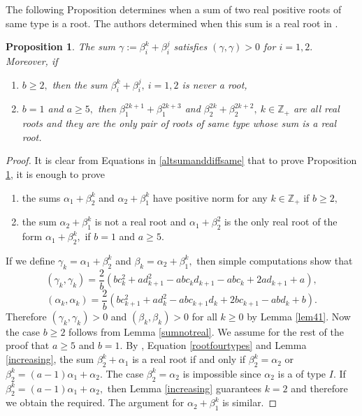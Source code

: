 \documentclass[12pt,reqno]{amsart}
\theoremstyle{plain}
\newtheorem{prop}{Proposition}
\theoremstyle{definition}
\theoremstyle{remark}
\newcommand\bz{\mathbb Z}
\begin{document}
The following Proposition determines when a sum of two real positive roots of same type is a root. The authors determined when this sum is a real root in \cite{carbone2021commutator}.
\begin{prop}\label{Nsumsametype}
    The sum $\gamma:=\beta_{i}^{k}+\beta_{i}^{j}$ satisfies $(\gamma,\gamma)>0$ for $i=1,2.$ Moreover, if 
    \begin{enumerate}
        \item $b\geq 2,$ then the sum $\beta_{i}^{k}+\beta_{i}^{j},\ i=1,2$ is never a root,
        \item $b=1$ and $a\geq 5,$ then $\beta_{1}^{2k+1}+\beta_{1}^{2k+3}$ and $\beta_{2}^{2k}+\beta_{2}^{2k+2},\ k\in\bz_+$ are all real roots and they are the only pair of roots of same type whose sum is a real root.
    \end{enumerate}
\end{prop}
\begin{proof}
    It is clear from Equations in \ref{altsumanddiffsame} that to prove Proposition \ref{Nsumsametype}, it is enough to prove 
\begin{enumerate}
    \item the sums $\alpha_1+\beta_2^k$ and $\alpha_2+\beta_1^k$ have positive norm for any $k\in\bz_+$ if $b\geq 2,$ 
    \item the sum $\alpha_2+\beta_1^k$ is not a real root and $\alpha_1+\beta_2^2$ is the only real root of the form $\alpha_1+\beta_2^k,$ if $b=1$ and $a\geq 5.$
\end{enumerate}
 If we define $\gamma_k=\alpha_1+\beta_2^k$ and $\beta_k=\alpha_2+\beta_1^k,$ then simple computations show that 
 $$(\gamma_k,\gamma_k)=\frac{2}{b}(bc_k^2+ad_{k+1}^2-abc_kd_{k+1}-abc_k+2ad_{k+1}+a),$$
$$(\alpha_k,\alpha_k)=\frac{2}{b}(bc_{k+1}^2+ad_{k}^2-abc_{k+1}d_{k}+2bc_{k+1}-abd_{k}+b).$$ 
Therefore $(\gamma_k,\gamma_k)>0$ and $(\beta_k,\beta_k)>0$ for all $k\geq 0$ by Lemma \ref{lem41}. Now the case $b\geq 2$ follows from Lemma \ref{sumnotreal}.
 We assume for the rest of the proof that $a\geq 5$ and $b=1.$ By \cite[Theorem 3.6]{carbone2021commutator}, Equation \ref{rootfourtypes} and Lemma \ref{increasing}, the sum $\beta_2^k+\alpha_1$ is a real root if and only if $\beta_2^k=\alpha_2$ or $\beta_2^k=(a-1)\alpha_1+\alpha_2$. The case $\beta_2^k=\alpha_2$ is impossible since $\alpha_2$ is a of type $I.$ If $\beta_2^k=(a-1)\alpha_1+\alpha_2,$ then Lemma \ref{increasing} guarantees $k=2$ and therefore we obtain the required. The argument for $\alpha_2+\beta_1^k$ is similar.
\end{proof}
\end{document}

